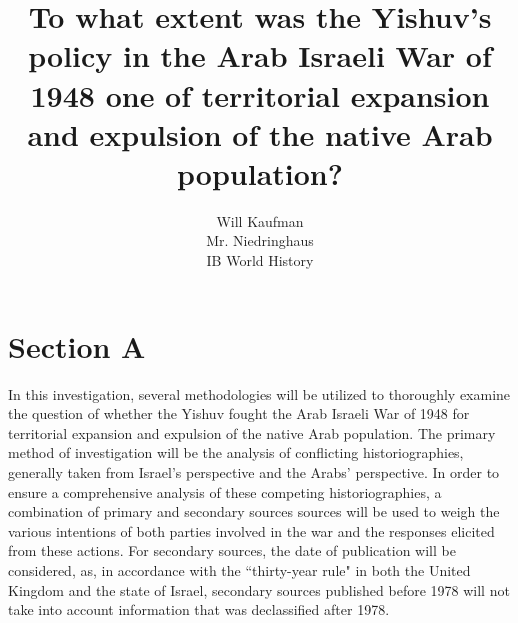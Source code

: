 \documentclass{turabian-researchpaper}
\begin{document}
\title{To what extent was the Yishuv's policy in the Arab Israeli War of 1948 one of territorial expansion and expulsion of the native Arab population?}

\author{Will Kaufman \\ Mr. Niedringhaus \\ IB World History}
\maketitle

\section{Section A}
In this investigation, several methodologies will be utilized to thoroughly examine the question of whether the Yishuv fought the Arab Israeli War of 1948 for territorial expansion and expulsion of the native Arab population.  The primary method of investigation will be the analysis of conflicting historiographies, generally taken from Israel's perspective and the Arabs' perspective.  In order to ensure a comprehensive analysis of these competing historiographies, a combination of primary and secondary sources sources will be used to weigh the various intentions of both parties involved in the war and the responses elicited from these actions.  For secondary sources, the date of publication will be considered, as, in accordance with the ``thirty-year rule" in both the United Kingdom and the state of Israel, secondary sources published before 1978 will not take into account information that was declassified after 1978.
\end{document}
